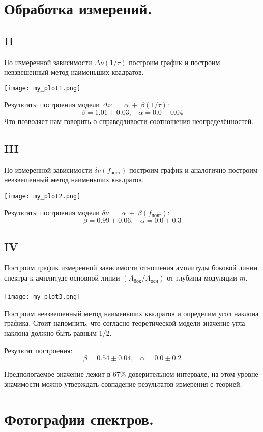\section{\label{sec:level1}Обработка измерений.}

\subsection{\label{sec:level2}II}

По измеренной зависимости $\Delta{\nu}(1/\tau)$ построим график и построим невзвешенный метод наименьших квадратов. 

\texttt{[image: my\_plot1.png]}

Результаты построения модели $\Delta{\nu}~=~\alpha~+~\beta(1/\tau)$:
$$ \beta = 1.01 \pm 0.03,~~~~
 \alpha = 0.0 \pm 0.04$$
Что позволяет нам говорить о справедливости соотношения неопределённостей. 

\subsection{\label{sec:level2}III}

По измеренной зависимости $\delta{\nu}(f_\text{повт})$ построим график и аналогично построим невзвешенный метод наименьших квадратов. 

\texttt{[image: my\_plot2.png]}

Результаты построения модели $\delta{\nu}~=~\alpha~+~\beta(f_\text{повт})$:
$$ \beta = 0.99 \pm 0.06,~~~~
 \alpha = 0.0 \pm 0.3$$

\subsection{\label{sec:level2}IV}

Построим график измеренной зависимости отношения амплитуды боковой линии спектра к амплитуде основной линии $(A_\text{бок}/A_\text{осн})$ от глубины модуляции $m$.\\
\\
\texttt{[image: my\_plot3.png]}

Построим невзвешенный метод наименьших квадратов и определим угол наклона графика. Стоит напомнить, что согласно теоретической модели значение угла наклона должно быть равным 1/2.

Результат построения:
$$ \beta = 0.54 \pm 0.04,~~~~
 \alpha = 0.0 \pm 0.2$$
 
Предпологаемое значение лежит в 67\% доверительном интервале, на этом уровне значимости можно утверждать совпадение результатов измерения с теорией.

\newpage
\section{\label{sec:level1}Фотографии спектров.}






